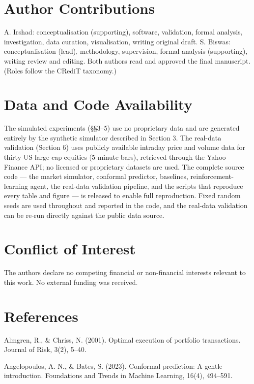 \section*{Author Contributions}

A. Irshad: conceptualisation (supporting), software, validation, formal
analysis, investigation, data curation, visualisation, writing original
draft. S. Biswas: conceptualisation (lead), methodology, supervision,
formal analysis (supporting), writing review and editing. Both authors
read and approved the final manuscript. (Roles follow the CRediT
taxonomy.)

\section*{Data and Code Availability}

The simulated experiments (§§3--5) use no proprietary data and are
generated entirely by the synthetic simulator described in Section 3.
The real-data validation (Section 6) uses publicly available intraday
price and volume data for thirty US large-cap equities (5-minute bars),
retrieved through the Yahoo Finance API; no licensed or proprietary
datasets are used. The complete source code --- the market simulator,
conformal predictor, baselines, reinforcement-learning agent, the
real-data validation pipeline, and the scripts that reproduce every
table and figure --- is released to enable full reproduction. Fixed
random seeds are used throughout and reported in the code, and the
real-data validation can be re-run directly against the public data
source.

\section*{Conflict of Interest}

The authors declare no competing financial or non-financial interests
relevant to this work. No external funding was received.

\section*{References}
\begingroup
\small
\setlength{\parindent}{0pt}
\setlength{\parskip}{5pt}
\everypar{\hangindent=1.5em}
Almgren, R., \& Chriss, N. (2001). Optimal execution of portfolio
transactions. Journal of Risk, 3(2), 5--40.

Angelopoulos, A. N., \& Bates, S. (2023). Conformal prediction: A gentle
introduction. Foundations and Trends in Machine Learning, 16(4),
494--591.

